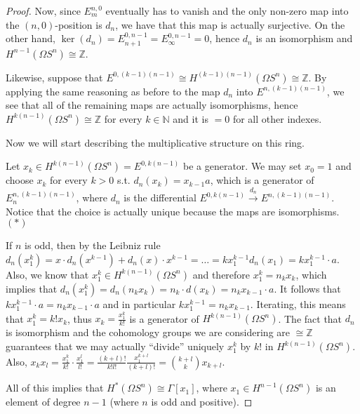 \documentclass{article}
\newcommand{\numberset}{\mathbb}
\newcommand{\N}{\numberset{N}}
\newcommand{\Z}{\numberset{Z}}
\begin{document}
\begin{proof}
    Now, since $E^{n,0}_m$ eventually has to vanish and the only non-zero map
    into the $(n,0)$-position is $d_n$, we have that this map is actually
    surjective. On the other hand,
    $\ker(d_n)=E^{0,n-1}_{n+1}=E^{0,n-1}_\infty=0$, hence $d_n$ is an
    isomorphism and $H^{n-1}(\Omega S^n)\cong\Z$.

    Likewise, suppose that $E^{0,(k-1)(n-1)}\cong H^{(k-1)(n-1)}(\Omega S^n)
    \cong\Z$. By applying the same reasoning as before to the map $d_n$ into
    $E^{n,(k-1)(n-1)}$, we see that all of the remaining maps are actually
    isomorphisms, hence $H^{k(n-1)}(\Omega S^n)\cong\Z$ for every $k\in\N$ and
    it is $=0$ for all other indexes.

    Now we will start describing the multiplicative structure on this ring.

    Let $x_k\in H^{k(n-1)}(\Omega S^n)=E^{0,k(n-1)}$ be a generator. We may set
    $x_0=1$ and choose $x_k$ for every $k>0$ s.t. $d_n(x_k)=x_{k-1}a$, which is
    a generator of $E^{n,(k-1)(n-1)}_n$, where $d_n$ is the differential
    $E^{0,k(n-1)}\xrightarrow{d_n}E^{n,(k-1)(n-1)}$. Notice that the choice is
    actually unique because the maps are isomorphisms. $(*)$
    
    If $n$ is odd, then by the Leibniz rule $d_n(x_1^k)=x\cdot
    d_n(x^{k-1})+d_n(x)\cdot x^{k-1}=\ldots=kx_1^{k-1}d_n(x_1)=kx_1^{k-1}\cdot
    a$. Also, we know that $x_1^k\in H^{k(n-1)}(\Omega S^n)$ and therefore
    $x_1^k=n_kx_k$, which implies that $d_n(x_1^k)=d_n(n_kx_k)=n_k\cdot
    d(x_k)=n_kx_{k-1}\cdot a$. It follows that $kx_1^{k-1}\cdot a=n_kx_{k-1}
    \cdot a$ and in particular $kx_1^{k-1}=n_kx_{k-1}$. Iterating, this means
    that $x_1^k=k!x_k$, thus $x_k=\frac{x_1^k}{k!}$ is a generator of
    $H^{k(n-1)}(\Omega S^n)$. The fact that $d_n$ is isomorphism and the
    cohomology groups we are considering are $\cong\Z$ guarantees that we may
    actually ``divide'' uniquely $x_1^k$ by $k!$ in $H^{k(n-1)}(\Omega S^n)$.
    Also, $x_kx_l=\frac{x_1^k}{k!}\cdot\frac{x_1^l}{l!}=\frac{(k+l)!}{k!l!}
    \frac{x_1^{k+l}}{(k+l)!}=\binom{k+l}{k}x_{k+l}$.

    All of this implies that $H^*(\Omega S^n)\cong\Gamma[x_1]$, where $x_1\in
    H^{n-1}(\Omega S^n)$ is an element of degree $n-1$ (where $n$ is odd and
    positive).
\end{proof}
\end{document}
